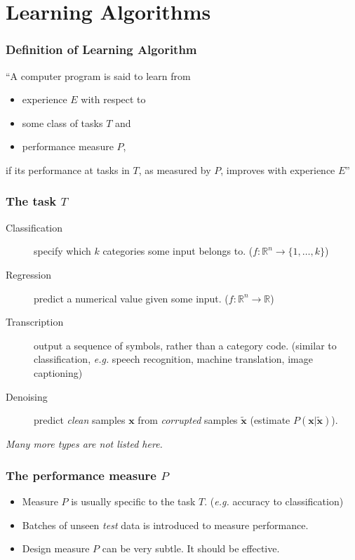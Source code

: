 \documentclass{beamer}
\begin{document}
\section{Learning Algorithms}

\begin{frame}
  \frametitle{Definition of Learning Algorithm}

  ``A computer program is said to learn from
  \begin{itemize}
    \item[\checkmark] experience $E$ with respect to
    \item[\checkmark] some class of tasks $T$ and
    \item[\checkmark] performance measure $P$,
  \end{itemize}
  if its performance at tasks in $T$, as measured by $P$, improves with experience $E$'' \cite{mitchelltm1997}

\end{frame}

\begin{frame}
  \frametitle{The task $T$}

  \begin{description}
    \item[Classification] specify which $k$ categories some input belongs to. ($f: \mathbb{R}^{n}\rightarrow \{1,\ldots,k\}$)
    \item[Regression] predict a numerical value given some input. ($f: \mathbb{R}^{n}\rightarrow\mathbb{R}$)
    \item[Transcription] output a sequence of symbols, rather than a category code. (similar to classification, \emph{e.g.} speech recognition, machine translation, image captioning)
    \item[Denoising] predict \emph{clean} samples $\bm{x}$ from \emph{corrupted} samples $\tilde{\mathbf{x}}$ (estimate $P(\mathbf{x}|\tilde{\mathbf{x}})$).
  \end{description}

\small
\emph{Many more types are not listed here.}
\end{frame}

\begin{frame}
  \frametitle{The performance measure $P$}

  \begin{itemize}
    \item[\ding{226}] Measure $P$ is usually specific to the task $T$. (\emph{e.g.} accuracy to classification)
    \item[\ding{226}] Batches of unseen \emph{test} data is introduced to measure performance.
    \item[\ding{226}] Design measure $P$ can be very subtle. It should be effective.
  \end{itemize}
\end{frame}
\end{document}
